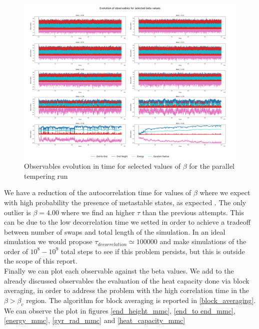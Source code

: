 \begin{figure}[H]
    \centering
    \includegraphics[width=\textwidth]{FIG/exercise_6_images/observables_mmc_polymer_summary.png}
    \caption{Observables evolution in time for selected values of $\beta$ for the parallel tempering run}
    \label{lec6:polymer_evolution_mmc}
\end{figure}

We have a reduction of the autocorrelation time for values of $\beta$ where we expect with high probability the presence of metastable states, as expected \cite{OrlandoBrando}. The only outlier is $\beta = 4.00$ where we 
find an higher $\tau$ than the previous attempts. This can be due to the low decorrelation time we setted in order to achieve a tradeoff between number of swaps and total length of the simulation.
In an ideal simulation we would propose $\tau_{decorrelation} \simeq 100000$ and make simulations of the order of $10^8-10^9$ total steps to see if this problem persists, but this is outside the scope of this report. \\
Finally we can plot each observable against the beta values. We add to the already discussed observables the evaluation of the heat capacity done via block averaging, in order 
to address the problem with the high correlation time in the $\beta > \beta_c$ region. The algorithm for block averaging is reported in \ref{block_averaging}. 
We can observe the plot in figures \ref{end_height_mmc}, \ref{end_to end_mmc}, \ref{energy_mmc}, \ref{gyr_rad_mmc} and \ref{heat_capacity_mmc}

